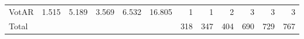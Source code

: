 \begin{table*}[t]
\begin{tabular}{l||r|r|r|r|r||r|r|r||r|r|r}
  VotAR                  & 1.515                 & 5.189                    & 3.569                      & 6.532                                      & 16.805                                  & 1                           & 1                            & 2                         & 3                           & 3                            & 3                          \\\hhline{=#*{4}{=}=#=|=|=#=|=|=}
  Total                  & \multicolumn{1}{r}{}  & \multicolumn{1}{r}{}     & \multicolumn{1}{r}{}       & \multicolumn{1}{r}{}                       & \multicolumn{1}{r||}{}                    & 318                         & 347                          & 404                       & 690                         & 729                          & 767
  \end{tabular}
\end{table*}
